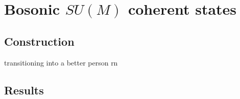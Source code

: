 \section{Bosonic $SU(M)$ coherent states}
	
\subsection{Construction}
transitioning into a better person rn
	
\subsection{Results}
